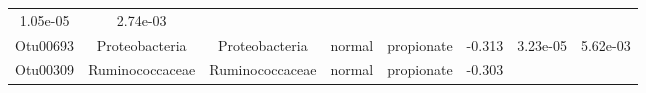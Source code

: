 \documentclass[11pt,]{article}
\begin{document}
\begin{longtable}[]{@{}cccccccc@{}}
\begin{minipage}[t]{0.08\columnwidth}
1.05e-05\strut
\end{minipage} & \begin{minipage}[t]{0.08\columnwidth}\centering\strut
2.74e-03\strut
\end{minipage}\tabularnewline
\begin{minipage}[t]{0.08\columnwidth}\centering\strut
Otu00693\strut
\end{minipage} & \begin{minipage}[t]{0.15\columnwidth}\centering\strut
Proteobacteria\strut
\end{minipage} & \begin{minipage}[t]{0.15\columnwidth}\centering\strut
Proteobacteria\strut
\end{minipage} & \begin{minipage}[t]{0.08\columnwidth}\centering\strut
normal\strut
\end{minipage} & \begin{minipage}[t]{0.09\columnwidth}\centering\strut
propionate\strut
\end{minipage} & \begin{minipage}[t]{0.07\columnwidth}\centering\strut
-0.313\strut
\end{minipage} & \begin{minipage}[t]{0.08\columnwidth}\centering\strut
3.23e-05\strut
\end{minipage} & \begin{minipage}[t]{0.08\columnwidth}\centering\strut
5.62e-03\strut
\end{minipage}\tabularnewline
\begin{minipage}[t]{0.08\columnwidth}\centering\strut
Otu00309\strut
\end{minipage} & \begin{minipage}[t]{0.15\columnwidth}\centering\strut
Ruminococcaceae\strut
\end{minipage} & \begin{minipage}[t]{0.15\columnwidth}\centering\strut
Ruminococcaceae\strut
\end{minipage} & \begin{minipage}[t]{0.08\columnwidth}\centering\strut
normal\strut
\end{minipage} & \begin{minipage}[t]{0.09\columnwidth}\centering\strut
propionate\strut
\end{minipage} & \begin{minipage}[t]{0.07\columnwidth}\centering\strut
-0.303\strut
\end{minipage} & \begin{minipage}[t]{0.08\columnwidth}\centering\strut

\end{minipage}
\end{longtable}
\end{document}

